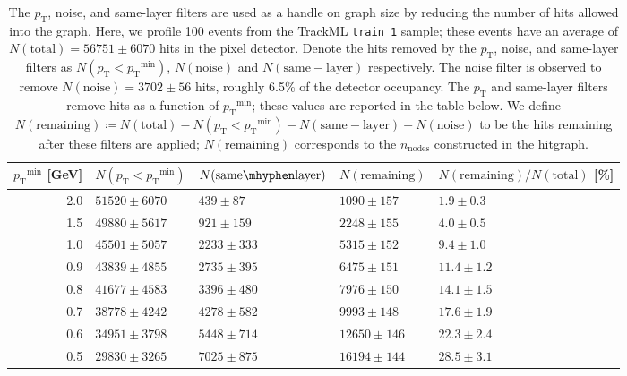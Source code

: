 \documentclass[twocolumn]{svjour3}
\newcommand{\pt}{\ensuremath{p_{\mathrm{T}}}\xspace}
\newcommand{\nnodes}{\ensuremath{n_\mathrm{nodes}\xspace}}
\begin{document}
\begin{table}
\centering
\caption{The $\pt$, noise, and same-layer filters are used as a handle on graph size by reducing the number of hits allowed into the graph. 
Here, we profile 100 events from the TrackML \texttt{train\_1} sample; these events have an average of $N(\mathrm{total}) = 56751\pm6070$ hits in the pixel detector. Denote the hits removed by the $\pt$, noise, and same-layer filters as $N(\pt<\pt^\mathrm{min})$, $N(\mathrm{noise})$ and $N(\mathrm{same-layer})$ respectively. 
The noise filter is observed to remove $N(\mathrm{noise})=3702\pm56$ hits, roughly 6.5\% of the detector occupancy. 
The $\pt$ and same-layer filters remove hits as a function of $\pt^\mathrm{min}$; these values are reported in the table below. 
We define $N(\mathrm{remaining})\coloneqq N(\mathrm{total})-N(\pt<\pt^\mathrm{min})-N(\mathrm{same-layer})-N(\mathrm{noise})$ to be the hits remaining after these filters are applied; $N(\mathrm{remaining})$ corresponds to the $\nnodes$ constructed in the hitgraph.}
\label{tab:hit_losses}      
\begin{tabular}{ r|ll|ll }
$\pt^\mathrm{min}$ [GeV] & $N(\pt<\pt^\mathrm{min})$ & $N(\mathrm{same\mhyphen layer})$ & $N(\mathrm{remaining})$ & $N(\mathrm{remaining})/N(\mathrm{total})$ [\%] \\ \hline
2.0  & $51520 \pm 6070$ &  $439 \pm 87$  & $1090\pm157 $ & $1.9\pm0.3$ \\
1.5  & $49880 \pm 5617$ &  $921 \pm 159$ & $2248\pm155 $ & $4.0\pm0.5$ \\
1.0  & $45501 \pm 5057$ &  $2233\pm 333$ & $5315\pm152 $ & $9.4\pm1.0$ \\ 
0.9  & $43839 \pm 4855$ &  $2735\pm 395$ & $6475\pm151 $ & $11.4\pm1.2$ \\ 
0.8  & $41677 \pm 4583$ &  $3396\pm 480$ & $7976\pm150 $ & $14.1\pm1.5$ \\ 
0.7  & $38778 \pm 4242$ &  $4278\pm 582$ & $9993\pm148 $ & $17.6\pm1.9$ \\ 
0.6  & $34951 \pm 3798$ &  $5448\pm 714$ & $12650\pm146 $ & $22.3\pm2.4$ \\ 
0.5  & $29830 \pm 3265$ &  $7025\pm 875$ & $16194\pm144 $ & $28.5\pm3.1$ \\
\end{tabular}
\end{table}
\end{document}
